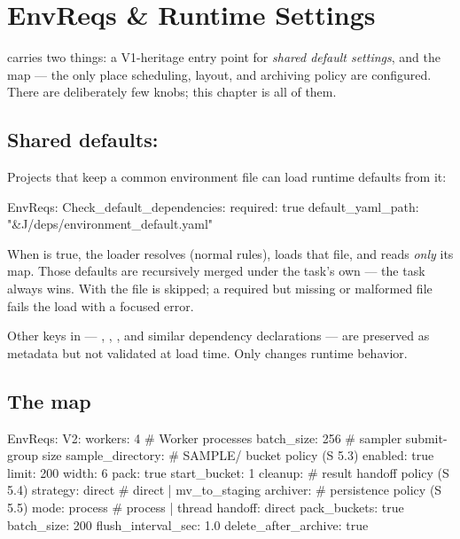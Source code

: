\chapter{EnvReqs \& Runtime Settings}
\label{ch:envreqs}

  carries two things: a
V1-heritage entry point for \emph{shared default settings}, and the  map ---
the only place scheduling,  layout, and archiving policy are configured.
There are deliberately few knobs; this chapter is all of them.

\section{Shared defaults: }
\label{sec:check-default-deps}

Projects that keep a common environment file can load runtime defaults from it:

\begin{yamlwin}
EnvReqs:
  Check_default_dependencies:
    required: true
    default_yaml_path: "&J/deps/environment_default.yaml"
\end{yamlwin}

When  is true, the loader resolves  (normal
 rules), loads that file, and reads \emph{only} its  map.
Those defaults are recursively merged under the task's own  --- the
task always wins. With  the file is skipped; a required but
missing or malformed file fails the load with a focused error.

\begin{jnote}
Other keys in  --- , ,
, and similar dependency declarations --- are preserved as metadata
but not validated at load time. Only  changes runtime behavior.
\end{jnote}

\section{The  map}
\label{sec:v2-map}

\begin{yamlwin}
EnvReqs:
  V2:
    workers: 4                # Worker processes
    batch_size: 256           # sampler submit-group size
    sample_directory:         # SAMPLE/ bucket policy      (S 5.3)
      enabled: true
      limit: 200
      width: 6
      pack: true
      start_bucket: 1
    cleanup:                  # result handoff policy      (S 5.4)
      strategy: direct        # direct | mv_to_staging
    archiver:                 # persistence policy         (S 5.5)
      mode: process           # process | thread
      handoff: direct
      pack_buckets: true
      batch_size: 200
      flush_interval_sec: 1.0
      delete_after_archive: true
\end{yamlwin}

